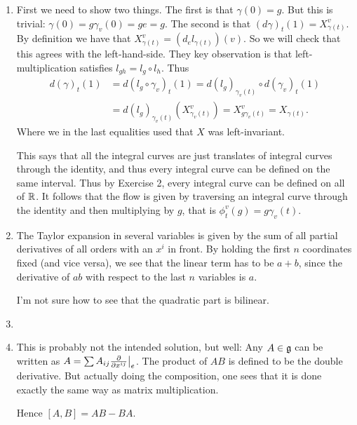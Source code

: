 \documentclass[11pt, english]{article}
\begin{document}
\begin{sol}
\begin{enumerate}
\item
First we need to show two things. The first is that $\gamma(0)=g$. But this is trivial: $\gamma(0)=g \gamma_v(0)=ge=g$. The second is that $(d\gamma)_t(1) = X_{\gamma(t)}^v$. By definition we have that $X_{\gamma(t)}^v=(d_e l_{\gamma(t)})(v)$. So we will check that this agrees with the left-hand-side. They key observation is that left-multiplication satisfies $l_{gh}=l_g \circ l_h$. Thus
\begin{align*}
d(\gamma)_t(1) &= d(l_g \circ \gamma_v)_t(1)=d(l_g)_{\gamma_v(t)} \circ d(\gamma_v)_t(1) \\
&= d(l_g)_{\gamma_v(t)} (X_{\gamma_v(t)}^v) = X_{g\gamma_v(t)}^v = X_{\gamma(t)}.
\end{align*}
Where we in the last equalities used that $X$ was left-invariant.

This says that all the integral curves are just translates of integral curves through the identity, and thus every integral curve can be defined on the same interval. Thus by Exercise 2, every integral curve can be defined on all of $\mathbb{R}$. It follows that the flow is given by traversing an integral curve through the identity and then multiplying by $g$, that is $\phi_t^v(g)=g\gamma_v(t)$. 

\item The Taylor expansion in several variables is given by the sum of all partial derivatives of all orders with an $x^i$ in front. By holding the first $n$ coordinates fixed (and vice versa), we see that the linear term has to be $a+b$, since the derivative of $ab$ with respect to the last $n$ variables is $a$.

I'm not sure how to see that the quadratic part is bilinear. 

\item 
\item This is probably not the intended solution, but well: Any $A \in \mathfrak g$ can be written as $A=\sum A_{ij} \restr{\dd{}{x^{ij}}}{e}$. The product of $AB$ is defined to be the double derivative. But actually doing the composition, one sees that it is done exactly the same way as matrix multiplication.

Hence $[A,B]=AB-BA$.
 
\end{enumerate}
\end{sol}
\end{document}
